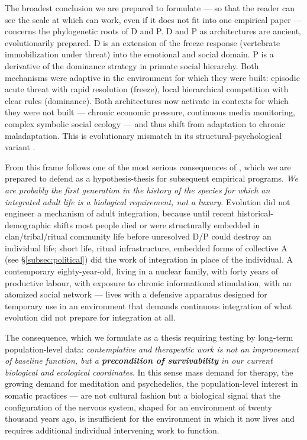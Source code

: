 The broadest conclusion we are prepared to formulate --- so that the reader can see the scale at which \DEIC{} can work, even if it does not fit into one empirical paper --- concerns the phylogenetic roots of D and P. D and P as architectures are ancient, evolutionarily prepared. D is an extension of the freeze response (vertebrate immobilization under threat) into the emotional and social domain. P is a derivative of the dominance strategy in primate social hierarchy. Both mechanisms were adaptive in the environment for which they were built: episodic acute threat with rapid resolution (freeze), local hierarchical competition with clear rules (dominance). Both architectures now activate in contexts for which they were not built --- chronic economic pressure, continuous media monitoring, complex symbolic social ecology --- and thus shift from adaptation to chronic maladaptation. This is evolutionary mismatch in its structural-psychological variant \citep[in the spirit of][]{lieberman2013, sapolsky2017}.

From this frame follows one of the most serious consequences of \DEIC{}, which we are prepared to defend as a hypothesis-thesis for subsequent empirical programs. \emph{We are probably the first generation in the history of the species for which an integrated adult life is a biological requirement, not a luxury.} Evolution did not engineer a mechanism of adult integration, because until recent historical-demographic shifts most people died or were structurally embedded in clan/tribal/ritual community life before unresolved D/P could destroy an individual life; short life, ritual infrastructure, embedded forms of collective A (see §\ref{subsec:political}) did the work of integration in place of the individual. A contemporary eighty-year-old, living in a nuclear family, with forty years of productive labour, with exposure to chronic informational stimulation, with an atomized social network --- lives with a defensive apparatus designed for temporary use in an environment that demands continuous integration of what evolution did not prepare for integration at all.

The consequence, which we formulate as a thesis requiring testing by long-term population-level data: \emph{contemplative and therapeutic work is not an improvement of baseline function, but a \textbf{precondition of survivability} in our current biological and ecological coordinates}. In this sense mass demand for therapy, the growing demand for meditation and psychedelics, the population-level interest in somatic practices --- are not cultural fashion but a biological signal that the configuration of the nervous system, shaped for an environment of twenty thousand years ago, is insufficient for the environment in which it now lives and requires additional individual intervening work to function.

